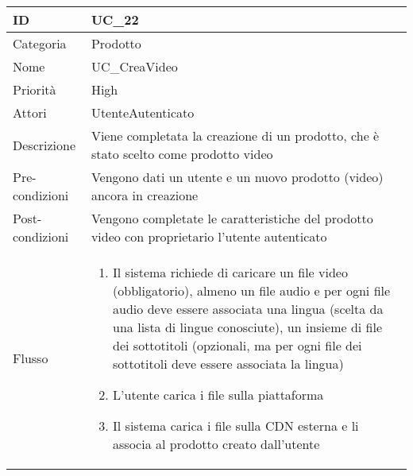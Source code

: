 \begin{center}
\begin{tabular}{ |p{2cm}|p{13cm}|  }
\hline
ID & UC\_22\\\hline
Categoria & Prodotto \\\hline
Nome & UC\_CreaVideo \\\hline
Priorità & High \\\hline
Attori &  UtenteAutenticato \\\hline
Descrizione & Viene completata la creazione di un prodotto, che è stato scelto come prodotto video\\\hline
Pre-condizioni &   Vengono dati un utente e un nuovo prodotto (video) ancora in creazione\\\hline
Post-condizioni &  Vengono completate le caratteristiche del prodotto video con proprietario l'utente autenticato\\\hline
Flusso &  	\begin{enumerate}
			\item Il sistema richiede di caricare un file video (obbligatorio), almeno un file audio e per ogni file audio deve essere associata una lingua (scelta da una lista di lingue conosciute), un insieme di file dei sottotitoli (opzionali, ma per ogni file dei sottotitoli deve essere associata la lingua)
			\item L'utente carica i file sulla piattaforma
			\item Il sistema carica i file sulla CDN esterna e li associa al prodotto creato dall'utente
		\end{enumerate}\\\hline
\end{tabular}
\label{table_use_case:22}\newline


\end{center}
